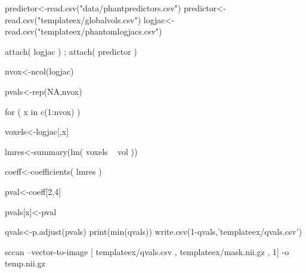 
predictor<-read.csv("data/phantpredictors.csv")
predictor<-read.csv("templateex/globalvols.csv")
logjac<-read.csv("templateex/phantomlogjacs.csv")

attach( logjac ) ; attach( predictor )

nvox<-ncol(logjac)

pvals<-rep(NA,nvox)

for ( x in c(1:nvox) ) 
{ 

  voxels<-logjac[,x]

  lmres<-summary(lm( voxels ~  vol ))

  coeff<-coefficients( lmres )

  pval<-coeff[2,4]

  pvals[x]<-pval

}
qvals<-p.adjust(pvals)
print(min(qvals))
write.csv(1-qvals,'templateex/qvals.csv')

 sccan --vector-to-image [ templateex/qvals.csv , templateex/mask.nii.gz , 1] -o temp.nii.gz

